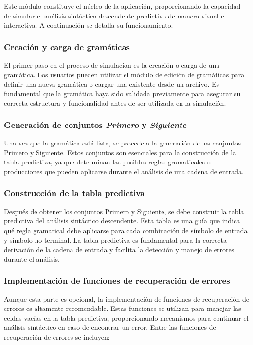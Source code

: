 Este módulo constituye el núcleo de la aplicación, proporcionando la capacidad de simular el análisis sintáctico descendente predictivo de manera visual e interactiva. A continuación se detalla su funcionamiento.

\subsubsection{Creación y carga de gramáticas}

El primer paso en el proceso de simulación es la creación o carga de una gramática. Los usuarios pueden utilizar el módulo de edición de gramáticas para definir una nueva gramática o cargar una existente desde un archivo. Es fundamental que la gramática haya sido validada previamente para asegurar su correcta estructura y funcionalidad antes de ser utilizada en la simulación.

\subsubsection{Generación de conjuntos \textit{Primero} y \textit{Siguiente}}

Una vez que la gramática está lista, se procede a la generación de los conjuntos Primero y Siguiente. Estos conjuntos son esenciales para la construcción de la tabla predictiva, ya que determinan las posibles reglas gramaticales o producciones que pueden aplicarse durante el análisis de una cadena de entrada.

\subsubsection{Construcción de la tabla predictiva}

Después de obtener los conjuntos Primero y Siguiente, se debe construir la tabla predictiva del análisis sintáctico descendente. Esta tabla es una guía que indica qué regla gramatical debe aplicarse para cada combinación de símbolo de entrada y símbolo no terminal. La tabla predictiva es fundamental para la correcta derivación de la cadena de entrada y facilita la detección y manejo de errores durante el análisis.

\subsubsection{Implementación de funciones de recuperación de errores}

Aunque esta parte es opcional, la implementación de funciones de recuperación de errores es altamente recomendable. Estas funciones se utilizan para manejar las celdas vacías en la tabla predictiva, proporcionando mecanismos para continuar el análisis sintáctico en caso de encontrar un error. Entre las funciones de recuperación de errores se incluyen:

